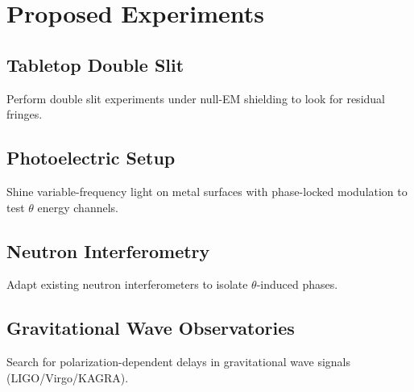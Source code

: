 \section{Proposed Experiments}

\subsection{Tabletop Double Slit}
Perform double slit experiments under null-EM shielding to look for residual
fringes.

\subsection{Photoelectric Setup}
Shine variable-frequency light on metal surfaces with phase-locked modulation
to test $\theta$ energy channels.

\subsection{Neutron Interferometry}
Adapt existing neutron interferometers to isolate $\theta$-induced phases.

\subsection{Gravitational Wave Observatories}
Search for polarization-dependent delays in gravitational wave signals
(LIGO/Virgo/KAGRA).

